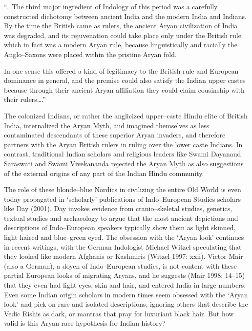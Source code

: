 \begin{myquote}
“...The third major ingredient of Indology of this period was a carefully constructed dichotomy between ancient India and the modern India and Indians. By the time the British came as rulers, the ancient Aryan civilization of India was degraded, and its rejuvenation could take place only under the British rule which in fact was a modern Aryan rule, because linguistically and racially the Anglo–Saxons were placed within the pristine Aryan fold.
\end{myquote}

\begin{myquote}
In one sense this offered a kind of legitimacy to the British rule and European dominance in general, and the premise could also satisfy the Indian upper castes because through their ancient Aryan affiliation they could claim cousinship with their rulers….”
\end{myquote}

The colonized Indians, or rather the anglicized upper–caste Hindu elite of British India, internalized the Aryan Myth, and imagined themselves as less contaminated descendants of these superior Aryan invaders, and therefore partners with the Aryan British rulers in ruling over the lower caste Indians. In contrast, traditional Indian scholars and religious leaders like Swami Dayanand Saraswati and Swami Vivekananda rejected the Aryan Myth as also suggestions of the external origins of any part of the Indian Hindu community.

The role of these blonde–blue Nordics in civilizing the entire Old World is even today propagated in ‘scholarly’ publications of Indo–European Studies scholars like Day (2001). Day invokes evidence from cranio–skeletal studies, genetics, textual studies and archaeology to argue that the most ancient depictions and descriptions of Indo–European speakers typically show them as light skinned, light haired and blue–green eyed. The obsession with the ‘Aryan look’ continues in recent writings, with the German Indologist Michael Witzel speculating that they looked like modern Afghanis or Kashmiris (Witzel 1997: xxii). Victor Mair (also a German), a doyen of Indo–European studies, is not content with these partial European looks of migrating Aryans, and he suggests (Mair 1998: 14–15) that they even had light eyes, skin and hair, and entered India in large numbers. Even some Indian origin scholars in modern times seem obsessed with the ‘Aryan look’ and pick on rare and isolated descriptions, ignoring others that describe the Vedic Rishis as dark, or mantras that pray for luxuriant black hair. But how valid is this Aryan race hypothesis for Indian history?


